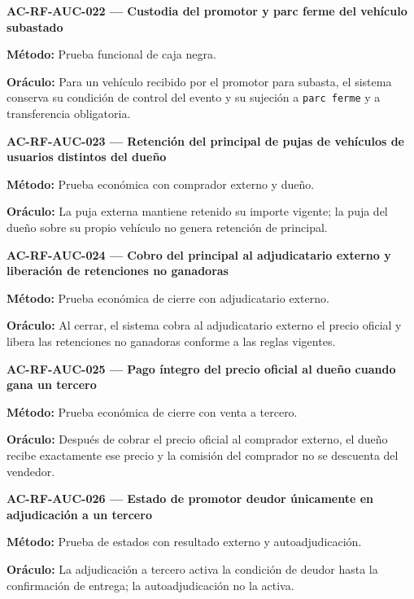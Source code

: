 \documentclass[10pt,letterpaper]{article}
\begin{document}
\noindent\textbf{AC-RF-AUC-022 --- Custodia del promotor y parc ferme del vehículo subastado}\par
\textbf{Método:} Prueba funcional de caja negra.\par
\textbf{Oráculo:} Para un vehículo recibido por el promotor para subasta, el sistema conserva su condición de control del evento y su sujeción a \texttt{parc ferme} y a transferencia obligatoria.\par\vspace{0.45em}
\noindent\textbf{AC-RF-AUC-023 --- Retención del principal de pujas de vehículos de usuarios distintos del dueño}\par
\textbf{Método:} Prueba económica con comprador externo y dueño.\par
\textbf{Oráculo:} La puja externa mantiene retenido su importe vigente; la puja del dueño sobre su propio vehículo no genera retención de principal.\par\vspace{0.45em}
\noindent\textbf{AC-RF-AUC-024 --- Cobro del principal al adjudicatario externo y liberación de retenciones no ganadoras}\par
\textbf{Método:} Prueba económica de cierre con adjudicatario externo.\par
\textbf{Oráculo:} Al cerrar, el sistema cobra al adjudicatario externo el precio oficial y libera las retenciones no ganadoras conforme a las reglas vigentes.\par\vspace{0.45em}
\noindent\textbf{AC-RF-AUC-025 --- Pago íntegro del precio oficial al dueño cuando gana un tercero}\par
\textbf{Método:} Prueba económica de cierre con venta a tercero.\par
\textbf{Oráculo:} Después de cobrar el precio oficial al comprador externo, el dueño recibe exactamente ese precio y la comisión del comprador no se descuenta del vendedor.\par\vspace{0.45em}
\noindent\textbf{AC-RF-AUC-026 --- Estado de promotor deudor únicamente en adjudicación a un tercero}\par
\textbf{Método:} Prueba de estados con resultado externo y autoadjudicación.\par
\textbf{Oráculo:} La adjudicación a tercero activa la condición de deudor hasta la confirmación de entrega; la autoadjudicación no la activa.\par\vspace{0.45em}
\end{document}
